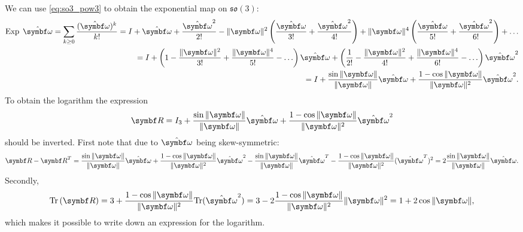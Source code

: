 We can use \eqref{eq:so3_pow3} to obtain the exponential map on $\mathfrak{so}(3)$:
\begin{equation}
  \label{eq:so3_exp}
  \begin{aligned}
    \Exp \; \hat {\bomega} = \sum_{k \geq 0} \frac{(\hat {\bomega})^k}{k!} = I + \hat{\bomega} + \frac{\hat{\bomega}^2}{2!} - \| \bomega \|^2 \left( \frac{\hat {\bomega}}{3!} + \frac{\hat {\bomega}^2}{4!} \right) + \| \bomega \|^4 \left( \frac{\hat {\bomega}}{5!} + \frac{\hat {\bomega}^2}{6!} \right) + \ldots \\
    = I + \left( 1 - \frac{\|\bomega \|^2}{3!} + \frac{\|\bomega \|^4}{5!} - \ldots \right) \hat{\bomega} + \left( \frac{1}{2!} - \frac{\|\bomega \|^2}{4!} + \frac{\|\bomega \|^4}{6!} - \ldots \right) \hat{\bomega}^2                                                                                               \\
    = I + \frac{\sin \| \bomega \|}{\|\bomega \|} \hat {\bomega} + \frac{1 - \cos \| \bomega \|}{\| \bomega \|^2} \hat {\bomega}^2.
  \end{aligned}
\end{equation}
To obtain the logarithm the expression
\begin{equation}
  \bR = I_3 + \frac{\sin \| \bomega \|}{\|\bomega \|} \hat {\bomega} + \frac{1 - \cos \| \bomega \|}{\| \bomega \|^2} \hat {\bomega}^2
\end{equation}
should be inverted. First note that due to $\hat \bomega$ being skew-symmetric:
\begin{equation}
  \label{eq:so3_log_deriv1}
  \bR - \bR^T =  \frac{\sin \| \bomega \|}{\|\bomega \|} \hat {\bomega} + \frac{1 - \cos \| \bomega \|}{\| \bomega \|^2} \hat {\bomega}^2 - \frac{\sin \| \bomega \|}{\|\bomega \|} \hat {\bomega} ^T - \frac{1 - \cos \| \bomega \|}{\| \bomega \|^2} (\hat {\bomega}^T)^2 = 2 \frac{\sin \|\bomega \|}{\| \bomega \|} \hat \bomega.
\end{equation}
Secondly,
\begin{equation}
  \label{eq:so3_log_deriv2}
  \tr \left(\bR  \right) = 3 + \frac{1 - \cos \| \bomega \|}{\|\bomega \|^2} \tr(\hat \bomega^2) =3 - 2 \frac{1 - \cos \| \bomega \|}{\|\bomega \|^2} \| \bomega \|^2 = 1 + 2 \cos \| \bomega \|,
\end{equation}
which makes it possible to write down an expression for the logarithm.

